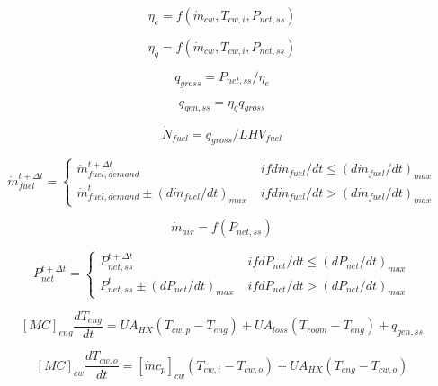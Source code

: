 \begin{equation}
{\eta_e} = f({\dot m_{cw}},{T_{cw,i}},{P_{net,ss}})
\end{equation}

\begin{equation}
{\eta_q} = f({\dot m_{cw}},{T_{cw,i}},{P_{net,ss}})
\end{equation}

\begin{equation}
{q_{gross}} = {P_{net,ss}}/{\eta_e}
\end{equation}

\begin{equation}
{q_{gen,ss}} = {\eta_q}{q_{gross}}
\end{equation}

\begin{equation}
{\dot N_{fuel}} = {q_{gross}}/LH{V_{fuel}}
\end{equation}

\begin{equation}
\dot m_{fuel}^{t+\Delta t} = \left\{
    \begin{array}{cl}
      \dot m_{fuel,demand}^{t+\Delta t}       &\; if d\dot m_{fuel} / dt \le (d\dot m_{fuel}/dt)_{max} \\
      \dot m_{fuel,demand}^t \pm (d\dot m_{fuel}/dt)_{max}      &\; if d\dot m_{fuel} / dt \gt (d\dot m_{fuel}/dt)_{max} 
    \end{array}
  \right.
\end{equation}

\begin{equation}
{\dot m_{air}} = f({P_{net,ss}})
\end{equation}

\begin{equation}
P_{net}^{t+\Delta t} = \left\{
    \begin{array}{cl}
      P_{net,ss}^{t+\Delta t}       &\; if dP_{net} / dt \le (dP_{net}/dt)_{max} \\
      P_{net,ss}^t \pm (dP_{net}/dt)_{max}      &\; if dP_{net} / dt \gt (dP_{net}/dt)_{max} 
    \end{array}
  \right.
\end{equation}

\begin{equation}
{[MC]_{eng}}\frac{{d{T_{eng}}}}{{dt}} = U{A_{HX}}\left( {{T_{cw,p}} - {T_{eng}}} \right) + U{A_{loss}}\left( {{T_{room}} - {T_{eng}}} \right) + {q_{gen,ss}}
\end{equation}

\begin{equation}
{[MC]_{cw}}\frac{{d{T_{cw,o}}}}{{dt}} = {[\dot m{c_p}]_{cw}}\left( {{T_{cw,i}} - {T_{cw,o}}} \right) + U{A_{HX}}\left( {{T_{eng}} - {T_{cw,o}}} \right)
\end{equation}

